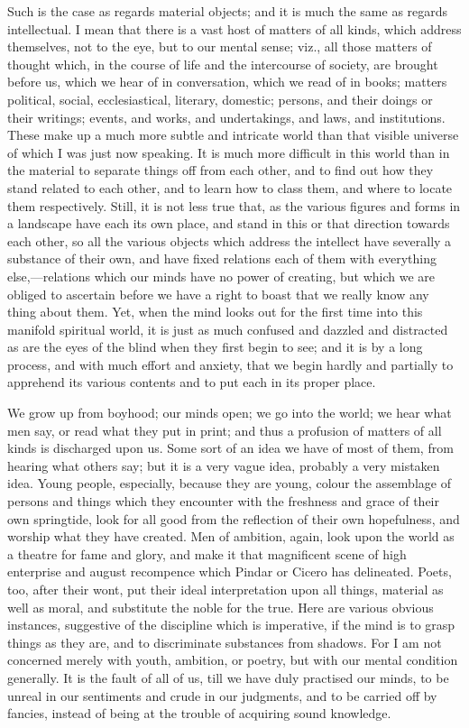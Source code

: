 Such is the case as regards material objects; and it is much the
same as regards intellectual. I mean that there is a vast host of
matters of all kinds, which address themselves, not to the eye, but to
our mental sense; viz., all those matters of thought which, in the
course of life and the intercourse of society, are brought
before us, which we hear of in conversation, which we read of in
books; matters political, social, ecclesiastical, literary, domestic;
persons, and their doings or their writings; events, and works, and
undertakings, and laws, and institutions. These make up a much more
subtle and intricate world than that visible universe of which I was
just now speaking. It is much more difficult in this world than in the
material to separate things off from each other, and to find out how
they stand related to each other, and to learn how to class them, and
where to locate them respectively. Still, it is not less true that, as
the various figures and forms in a landscape have each its own place,
and stand in this or that direction towards each other, so all the
various objects which address the intellect have severally a substance
of their own, and have fixed relations each of them with everything
else,—relations which our minds have no power of creating, but which
we are obliged to ascertain before we have a right to boast that we
really know any thing about them. Yet, when the mind looks out for the
first time into this manifold spiritual world, it is just as much
confused and dazzled and distracted as are the eyes of the blind when
they first begin to see; and it is by a long process, and with much
effort and anxiety, that we begin hardly and partially to apprehend
its various contents and to put each in its proper place.

We grow up from boyhood; our minds open; we go into the world; we
hear what men say, or read what they put in print; and thus a
profusion of matters of all kinds is discharged upon us. Some sort of
an idea we have of most of them, from hearing what others say; but it
is a very vague idea, probably a very mistaken idea. Young people,
especially, because they are young, colour the assemblage of
persons and things which they encounter with the freshness and grace
of their own springtide, look for all good from the reflection of
their own hopefulness, and worship what they have created. Men of
ambition, again, look upon the world as a theatre for fame and glory,
and make it that magnificent scene of high enterprise and august
recompence which Pindar or Cicero has delineated. Poets, too, after
their wont, put their ideal interpretation upon all things, material
as well as moral, and substitute the noble for the true. Here are
various obvious instances, suggestive of the discipline which is
imperative, if the mind is to grasp things as they are, and to
discriminate substances from shadows. For I am not concerned merely
with youth, ambition, or poetry, but with our mental condition
generally. It is the fault of all of us, till we have duly practised
our minds, to be unreal in our sentiments and crude in our judgments,
and to be carried off by fancies, instead of being at the trouble of
acquiring sound knowledge.

